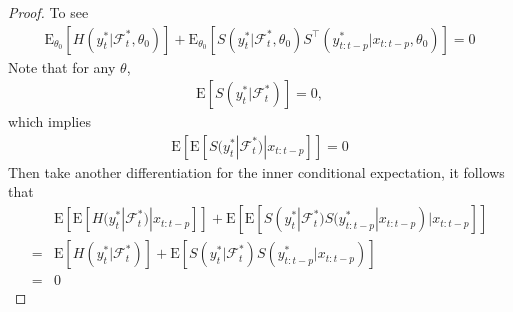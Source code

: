 \documentclass[a4paper,12pt]{article}
\newcommand{\E}{\mathop{\mathbb{E}}}
\def \trans{^\intercal}
\def \E{\mbox{E}}
\def \F {\mathcal{F}}
\begin{document}
\begin{proof}
To see 
\begin{align*}
\E_{\theta_0} \left[ H(y_t^*|\F_{t}^*,\theta_0) \right] +\E_{\theta_0}\left[  S(y_t^*|\F_{t}^*,\theta_0) S\trans(y_{t:t-p}^*|x_{t:t-p},\theta_0)\right]=0
\end{align*}
Note that for any $\theta$,
\begin{align*}
\E\left[ S(y_t^*|\F_t^*) \right] = 0,
\end{align*}
which implies
\begin{align*}
\E\left[ \E[S(y_t^*|\F_{t}^*)|x_{t:t-p}] \right]=0
\end{align*}
Then take another differentiation for the inner conditional expectation, it follows that
\begin{align*}
&\E\left[ \E[H(y_t^*|\F_{t}^*)|x_{t:t-p}] \right]
+
\E\left[ \E[S(y_t^*|\F_{t}^*) S(y_{t:t-p}^*|x_{t:t-p})|x_{t:t-p}] \right]\\
=&
\E\left[ H(y_t^*|\F_{t}^*)\right]
+
\E\left[ S(y_t^*|\F_{t}^*) S(y_{t:t-p}^*|x_{t:t-p}) \right]\\
=&0
\end{align*}

\end{proof}
\end{document}
